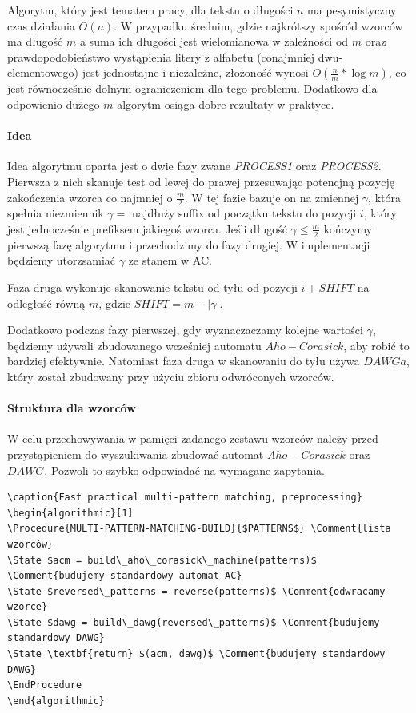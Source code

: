 Algorytm, który jest tematem pracy, dla tekstu o długości $n$ ma pesymistyczny czas działania $O(n)$.
W przypadku średnim, gdzie najkrótszy spośród wzorców ma długość $m$ a suma ich długości jest wielomianowa w zależności od $m$ oraz prawdopodobieństwo wystąpienia litery z alfabetu (conajmniej dwu-elementowego) jest jednostajne i niezależne, złożoność wynosi $O(\frac{n}{m}* \log{m})$, co jest równocześnie dolnym ograniczeniem dla tego problemu.
Dodatkowo dla odpowienio dużego $m$ algorytm osiąga dobre rezultaty w praktyce.

\paragraph{Idea}

Idea algorytmu oparta jest o dwie fazy zwane \textit{PROCESS1} oraz \textit{PROCESS2}. Pierwsza z nich skanuje test od lewej do prawej przesuwając potencjną pozycję zakończenia wzorca co najmniej o $\frac{m}{2}$. W tej fazie bazuje on na zmiennej $\gamma$, która spełnia niezmiennik $\gamma = $ najdłuży suffix od początku tekstu do pozycji $i$, który jest jednocześnie prefiksem jakiegoś wzorca. Jeśli długość $\gamma \leq \frac{m}{2}$ kończymy pierwszą fazę algorytmu i przechodzimy do fazy drugiej. W implementacji będziemy utorzsamiać $\gamma$ ze stanem w AC.

Faza druga wykonuje skanowanie tekstu od tyłu od pozycji $i + SHIFT$ na odległość równą $m$, gdzie $SHIFT = m - |\gamma|$.

Dodatkowo podczas fazy pierwszej, gdy wyznaczaczamy kolejne wartości $\gamma$, będziemy używali zbudowanego wcześniej automatu $Aho-Corasick$, aby robić to bardziej efektywnie. Natomiast faza druga w skanowaniu do tyłu używa $DAWGa$, który został zbudowany przy użyciu zbioru odwróconych wzorców.  

\paragraph{Struktura dla wzorców}
W celu przechowywania w pamięci zadanego zestawu wzorców należy przed przystąpieniem do wyszukiwania zbudować automat $Aho-Corasick$ oraz $DAWG$. Pozwoli to szybko odpowiadać na wymagane zapytania.

\begin{verbatim}
\caption{Fast practical multi-pattern matching, preprocessing}
\begin{algorithmic}[1]
\Procedure{MULTI-PATTERN-MATCHING-BUILD}{$PATTERNS$} \Comment{lista wzorców}
\State $acm = build\_aho\_corasick\_machine(patterns)$ \Comment{budujemy standardowy automat AC}
\State $reversed\_patterns = reverse(patterns)$ \Comment{odwracamy wzorce}
\State $dawg = build\_dawg(reversed\_patterns)$ \Comment{budujemy standardowy DAWG}
\State \textbf{return} $(acm, dawg)$ \Comment{budujemy standardowy DAWG}
\EndProcedure
\end{algorithmic}
\end{verbatim}

